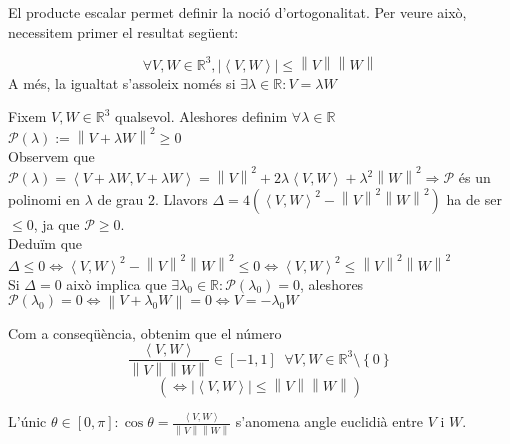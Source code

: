 \documentclass[../main.tex]{subfiles}
\begin{document}
	El producte escalar permet definir la noció d'ortogonalitat. Per veure això, necessitem primer el
	resultat següent:
	\begin{teorema}
	    \begin{displaymath}
	        \forall V, W \in \mathbb{R}^3, \left\lvert \left\langle V, W\right\rangle \right\rvert \leq \left\lVert V\right\rVert \left\lVert W\right\rVert
	    \end{displaymath}
	    A més, la igualtat s'assoleix només si $\exists \lambda \in \mathbb{R}: V = \lambda W$
	\end{teorema}
	\begin{demostracio}
	    Fixem $V, W \in \mathbb{R}^3$ qualsevol. Aleshores definim $\forall\lambda\in\mathbb{R}$\\$\mathcal{P}(\lambda):=\left\lVert V+\lambda W\right\rVert^2 \geq 0$\\
	    Observem que $\mathcal{P}(\lambda)=\left\langle V+\lambda W, V+\lambda W\right\rangle = \left\lVert V\right\rVert^2 + 2\lambda\left\langle V,W\right\rangle + \lambda^2\left\lVert W\right\rVert^2 \Rightarrow \mathcal{P}$
	    és un polinomi en $\lambda$ de grau $2$. Llavors $\Delta = 4\left(\left\langle V,W\right\rangle^2 - \left\lVert V\right\rVert^2\left\lVert W\right\rVert^2\right)$ ha de ser $\leq 0$, ja que $\mathcal{P} \geq 0$.\\
	    Deduïm que $\Delta \leq 0 \iff \left\langle V, W\right\rangle^2-\left\lVert V\right\rVert^2\left\lVert W\right\rVert^2 \leq 0 \iff \left\langle V, W\right\rangle^2\leq\left\lVert V\right\rVert^2\left\lVert W\right\rVert^2$\\
	    Si $\Delta = 0$ això implica que $\exists \lambda_0 \in \mathbb{R} : \mathcal{P}\left(\lambda_0\right) = 0$, aleshores $\mathcal{P}\left(\lambda_0\right) = 0 \iff \left\lVert V+\lambda_0 W\right\rVert = 0 \iff V = - \lambda_0 W$
	\end{demostracio}
	Com a conseqüència, obtenim que el número
	\begin{displaymath}
	    \frac{\left\langle V, W\right\rangle}{\left\lVert V\right\rVert\left\lVert W\right\rVert } \in \left[-1, 1\right]\;\;\forall V, W \in \mathbb{R}^3\setminus\left\{0\right\}
	\end{displaymath}
	\begin{displaymath}
	    \left(\iff \left\lvert \left\langle V, W\right\rangle \right\rvert\leq\left\lVert V\right\rVert\left\lVert W\right\rVert\right)
	\end{displaymath}
	\begin{definicio}
	    L'únic $\theta \in \left[0, \pi\right] : \cos{\theta} = \frac{\left\langle V, W\right\rangle}{\left\lVert V\right\rVert\left\lVert W\right\rVert }$
	    s'anomena angle euclidià entre $V\text{ i }W$.
	\end{definicio}
\end{document}
